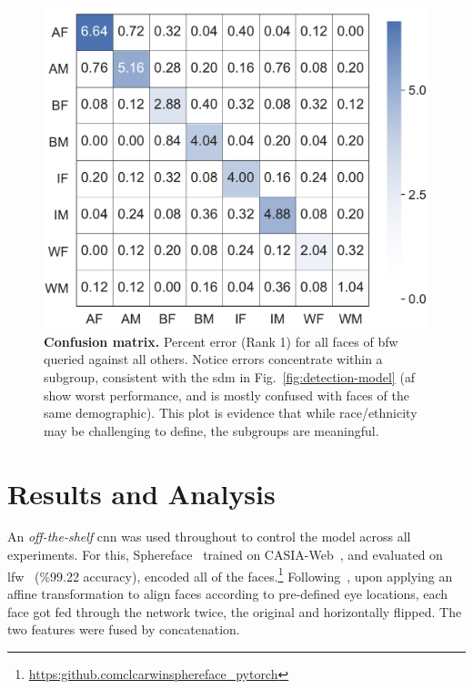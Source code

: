 \begin{figure}[t!]
	\centering    
	\includegraphics[width=\linewidth]{images/confusion.pdf}
		\caption{\small{\textbf{Confusion matrix.} Percent error (Rank 1) for all faces of \gls{bfw} queried against all others. Notice errors concentrate within a subgroup, consistent with the \gls{sdm} in Fig.~\ref{fig:detection-model} (\ie \gls{af} show worst performance, and is mostly confused with faces of the same demographic). This plot is evidence that while race/ethnicity may be challenging to define, the subgroups are meaningful.}}
		\label{fig:confusion} 
		\vspace{-5mm}
\end{figure} 

\section{Results and Analysis}
An {\em off-the-shelf} \gls{cnn} was used throughout to control the model across all experiments. For this, Sphereface~\cite{liu2017sphereface} trained on CASIA-Web~\cite{yi2014learning}, and evaluated on \gls{lfw}~\cite{LFWTech} (\%99.22 accuracy), encoded all of the faces.\footnote{\href{$https://github.com/clcarwin/sphereface\_pytorch$}{https:\/\/github.com\/clcarwin\/sphereface\_pytorch}} Following~\cite{liu2017sphereface}, upon applying an affine transformation to align faces according to pre-defined eye locations, each face got fed through the network twice, the original and horizontally flipped. The two features were fused by concatenation.


